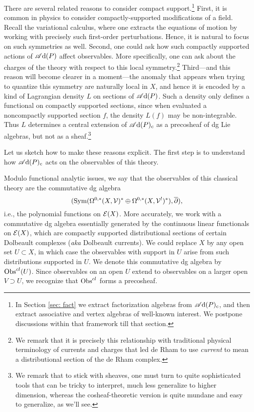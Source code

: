There are several related reasons to consider compact support.\footnote{In Section \ref{sec: fact} we extract factorization algebras from $\mathscr A{\rm d}(P)_c$,
and then extract associative and vertex algebras of well-known interest.
We postpone discussions within that framework till that section.}
First, it is common in physics to consider compactly-supported modifications of a field.
Recall the variational calculus, where one extracts the equations of motion by working with precisely such first-order perturbations.
Hence, it is natural to focus on such symmetries as well.
Second, one could ask how such compactly supported actions of $\mathscr A{\rm d}(P)$ affect observables.
More specifically, one can ask about the charges of the theory with respect to this local symmetry.\footnote{We remark that it is precisely this relationship with traditional physical terminology of currents and charges that led de Rham to use {\em current} to mean a distributional section of the de Rham complex.}
Third---and this reason will become clearer in a moment---the anomaly that appears when trying to quantize this symmetry are naturally local in $X$, and hence it is encoded by a kind of Lagrangian density $L$ on sections of $\mathscr A{\rm d}(P)$.
Such a density only defines a functional on compactly supported sections,
since when evaluated a noncompactly supported section $f$, the density $L(f)$ may be non-integrable.
Thus $L$ determines a central extension of $\mathscr A{\rm d}(P)_c$ as a precosheaf of dg Lie algebras,
but not as a sheaf.\footnote{We remark that to stick with sheaves, one must turn to quite sophisticated tools \cite{WittenGr,GetzlerGM,ManBeilSch} that can be tricky to interpret, much less generalize to higher dimension, whereas the cosheaf-theoretic version is quite mundane and easy to generalize, as we'll see.}

Let us sketch how to make these reasons explicit.
The first step is to understand how $\mathscr A{\rm d}(P)_c$ acts on the observables of this theory.

Modulo functional analytic issues,
we say that the observables of this classical theory are the commutative dg algebra
\[
({\rm Sym}(\Omega^{0,*}(X,\mathcal{V})^* \oplus \Omega^{0,*}(X, \mathcal{V}^!)^*), \overline{\partial}),
\]
i.e., the polynomial functions on $\mathcal E(X)$.
More accurately, we work with a commutative dg algebra essentially generated by the continuous linear functionals on $\mathcal E(X)$, 
which are compactly supported distributional sections of certain Dolbeault complexes ({\it aka} Dolbeault currents).
We could replace $X$ by any open set $U \subset X$, 
in which case the observables with support in $U$ arise from such distributions supported in $U$.
We denote this commutative dg algebra by ${\rm Obs}^{cl}(U)$.
Since observables on an open $U$ extend to observables on a larger open $V \supset U$,
we recognize that ${\rm Obs}^{cl}$ forms a precosheaf.

